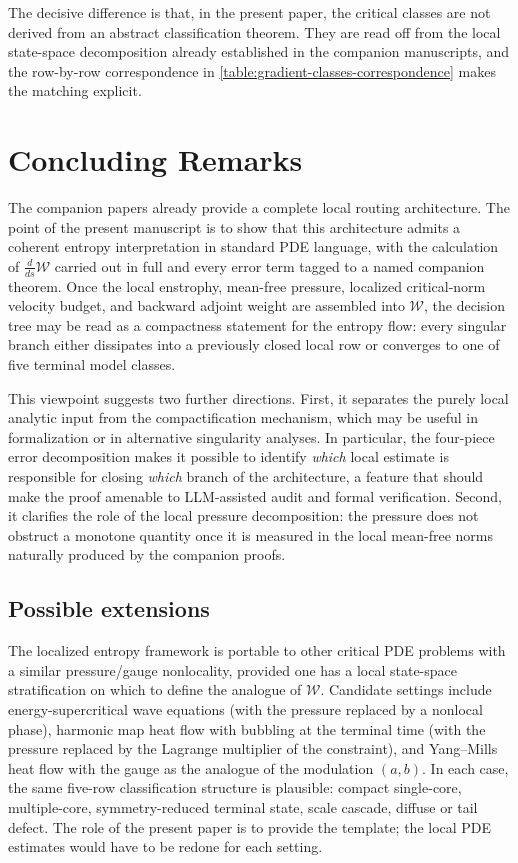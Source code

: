 \documentclass[11pt]{amsart}
\numberwithin{equation}{section}
\theoremstyle{plain}
\theoremstyle{definition}
\theoremstyle{remark}
\newcommand{\Wloc}{\mathcal W}
\begin{document}
The decisive difference is that, in the present paper, the critical
classes are not derived from an abstract classification theorem.  They are
read off from the local state-space decomposition already established in
the companion manuscripts, and the row-by-row correspondence in
\cref{table:gradient-classes-correspondence} makes the matching explicit.

\section{Concluding Remarks}

The companion papers already provide a complete local routing
architecture.  The point of the present manuscript is to show that this
architecture admits a coherent entropy interpretation in standard PDE
language, with the calculation of \(\frac{d}{ds}\Wloc\) carried out in
full and every error term tagged to a named companion theorem.  Once the
local enstrophy, mean-free pressure, localized critical-norm velocity budget,
and backward
adjoint weight are assembled into \(\Wloc\), the decision tree may be read
as a compactness statement for the entropy flow: every singular branch
either dissipates into a previously closed local row or converges to one of
five terminal model classes.

This viewpoint suggests two further directions.  First, it separates the
purely local analytic input from the compactification mechanism, which may
be useful in formalization or in alternative singularity analyses.  In
particular, the four-piece error decomposition makes it possible to
identify \emph{which} local estimate is responsible for closing
\emph{which} branch of the architecture, a feature that should make the
proof amenable to LLM-assisted audit and formal verification.  Second, it
clarifies the role of the local pressure decomposition: the pressure does
not obstruct a monotone quantity once it is measured in the local
mean-free norms naturally produced by the companion proofs.

\subsection*{Possible extensions}

The localized entropy framework is portable to other critical PDE problems
with a similar pressure/gauge nonlocality, provided one has a local
state-space stratification on which to define the analogue of
\(\Wloc\).  Candidate settings include energy-supercritical wave
equations (with the pressure replaced by a nonlocal phase), harmonic map
heat flow with bubbling at the terminal time (with the pressure replaced
by the Lagrange multiplier of the constraint), and Yang--Mills heat flow
with the gauge as the analogue of the modulation \((a,b)\).  In each case,
the same five-row classification structure is plausible: compact
single-core, multiple-core, symmetry-reduced terminal state, scale
cascade, diffuse or tail defect.  The role of the present paper is to
provide the template; the local PDE estimates would have to be redone for
each setting.
\end{document}
